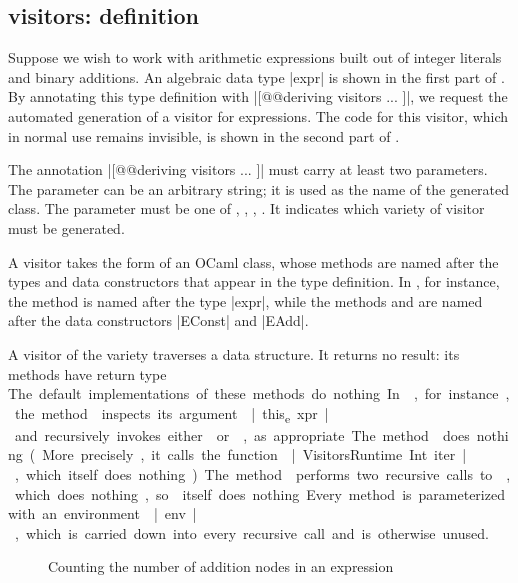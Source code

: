 \documentclass[11pt,a4paper,twoside]{article}
\begin{document}
\subsection{\iter visitors: definition}
\label{sec:intro:iter:def}

Suppose we wish to work with arithmetic expressions built out of integer
literals and binary additions. An algebraic data type \oc|expr| is shown in
the first part of . By annotating this type definition with
\oc|[@@deriving visitors { ... }]|, we request the automated generation of
a visitor for expressions. The code for this visitor, which in normal use
remains invisible, is shown in the second part of .

The annotation \oc|[@@deriving visitors { ... }]| must carry at least two
parameters. The parameter \name can be an arbitrary string; it is used as the
name of the generated class. The parameter \variety must be one of \iter,
\map, \itertwo, \maptwo. It indicates which variety of visitor must be
generated.

A visitor takes the form of an OCaml class, whose methods are named after the
types and data constructors that appear in the type definition. In
, for instance, the method  is named after
the type \oc|expr|, while the methods  and
 are named after the data constructors \oc|EConst| and
\oc|EAdd|.

A visitor of the \iter variety traverses a data structure. It returns no
result: its methods have return type \unit. The default implementations of
these methods do nothing. In , for instance, the method
 inspects its argument \oc|this_expr| and recursively
invokes either  or , as
appropriate. The method  does nothing. (More precisely,
it calls the function \oc|VisitorsRuntime.Int.iter|, which itself does
nothing.) The method  performs two recursive calls to
, which does nothing, so  itself does
nothing.

Every method is parameterized with an environment \oc|env|, which is carried
down into every recursive call and is otherwise unused.


\begin{figure}[t]
\caption{Counting the number of addition nodes in an expression}
\label{fig:expr04}
\end{figure}
\end{document}
